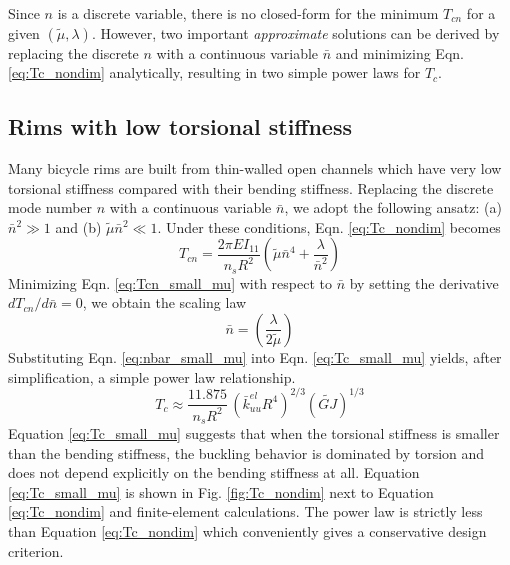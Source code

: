 \documentclass{bmd2016p}
\begin{document}
Since $n$ is a discrete variable, there is no closed-form for the minimum $T_{cn}$ for a given $(\tilde{\mu},\lambda)$. However, two important \textit{approximate} solutions can be derived by replacing the discrete $n$ with a continuous variable $\bar{n}$ and minimizing Eqn. \ref{eq:Tc_nondim} analytically, resulting in two simple power laws for $T_c$.


\subsection{Rims with low torsional stiffness}\label{sec:powerlaw_1}
Many bicycle rims are built from thin-walled open channels which have very low torsional stiffness compared with their bending stiffness. Replacing the discrete mode number $n$ with a continuous variable $\bar{n}$, we adopt the following ansatz: (a) $\bar{n}^2 \gg 1$ and (b) $\tilde{\mu}\bar{n}^2 \ll 1$. Under these conditions, Eqn. \ref{eq:Tc_nondim} becomes
	\begin{equation}\label{eq:Tcn_small_mu}
	T_{cn} = \frac{2\pi EI_{11}}{n_sR^2} \left( \tilde{\mu}\bar{n}^4 + \frac{\lambda}{\bar{n}^2}\right)
	\end{equation}
Minimizing Eqn. \ref{eq:Tcn_small_mu} with respect to $\bar{n}$ by setting the derivative $dT_{cn}/d\bar{n}=0$, we obtain the scaling law
	\begin{equation}\label{eq:nbar_small_mu}
	\bar{n} = \left(\frac{\lambda}{2\tilde{\mu}} \right)
	\end{equation}
Substituting Eqn. \ref{eq:nbar_small_mu} into Eqn. \ref{eq:Tc_small_mu} yields, after simplification, a simple power law relationship.
	\begin{equation}\label{eq:Tc_small_mu}
	T_c \approx \frac{11.875}{n_sR^2} \, \left(\bar{k}_{uu}^{el}R^4 \right)^{2/3} (\widetilde{GJ})^{1/3}
	\end{equation}
Equation \ref{eq:Tc_small_mu} suggests that when the torsional stiffness is smaller than the bending stiffness, the buckling behavior is dominated by torsion and does not depend explicitly on the bending stiffness at all. Equation \ref{eq:Tc_small_mu} is shown in Fig. \ref{fig:Tc_nondim} next to Equation \ref{eq:Tc_nondim} and finite-element calculations. The power law is strictly less than Equation \ref{eq:Tc_nondim} which conveniently gives a conservative design criterion.
\end{document}

